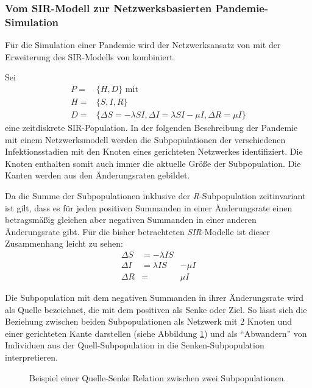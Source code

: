 \subsubsection{Vom SIR-Modell zur Netzwerksbasierten Pandemie-Simulation}
Für die Simulation einer Pandemie wird der Netzwerksansatz von \citep{Capasso1978} mit der Erweiterung des SIR-Modells von \citep{Sattenspiel1995} kombiniert. 

Sei 
\begin{align}
	P=&\lbrace H, D\rbrace \text{ mit}\label{eq:ssec:multiPop:SIRBegin}\\
	H=&\lbrace S, I, R\rbrace\\
	D=&\lbrace \Delta S= -\lambda SI, \Delta I = \lambda SI - \mu I, \Delta R = \mu I   \rbrace \label{eq:ssec:multiPop:SIREnd}
\end{align}
eine zeitdiskrete SIR-Population. In der folgenden Beschreibung der Pandemie mit einem Netzwerksmodell werden die Subpopulationen der verschiedenen Infektionsstadien mit den Knoten eines gerichteten Netzwerkes identifiziert. Die Knoten enthalten somit auch immer die aktuelle Größe der Subpopulation. Die Kanten werden aus den Änderungsraten gebildet. 

Da die Summe der Subpopulationen inklusive der \emph{R}-Subpopulation zeitinvariant ist gilt, dass es für jeden positiven Summanden in einer Änderungsrate einen betragsmäßig gleichen aber negativen Summanden in einer anderen Änderungsrate gibt. Für die bisher betrachteten \emph{SIR}-Modelle ist dieser Zusammenhang leicht zu sehen:
\begin{align}
	\Delta S & = -\lambda IS & \\
	\Delta I & = \lambda IS & - \mu I \\
	\Delta R & = & \mu I
\end{align}

Die Subpopulation mit dem negativen Summanden in ihrer Änderungsrate wird als Quelle bezeichnet, die mit dem positiven als Senke oder Ziel. So lässt sich die Beziehung zwischen beiden Subpopulationen als Netzwerk mit 2 Knoten und einer gerichteten Kante darstellen (siehe Abbildung \ref{fig:ssec:multiPop:simpleDirectedEdge}) und als ``Abwandern'' von Individuen aus der Quell-Subpopulation in die Senken-Subpopulation interpretieren.

\begin{figure}
\begin{center}\end{center}
\caption{Beispiel einer Quelle-Senke Relation zwischen zwei Subpopulationen.}\label{fig:ssec:multiPop:simpleDirectedEdge}
\end{figure}

